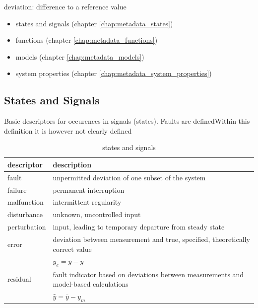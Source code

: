 deviation: difference to a reference value


\begin{itemize}
    \bfseries
    \item states and signals (chapter \ref{chap:metadata_states})
    \item functions (chapter \ref{chap:metadata_functions})
    \item models (chapter \ref{chap:metadata_models})
    \item system properties (chapter \ref{chap:metadata_system_properties})
\end{itemize}

\subsection{States and Signals}
Basic descriptors for occurences in signals (states). Faults are definedWithin this definition it is however not clearly defined

\label{chap:metadata_states}
\begin{table}[!h]
    \centering
    \begin{tabular}{@{}ll@{}}
        \toprule
        descriptor   & description                                                                           \\ \midrule
        fault        & unpermitted deviation of one subset of the system                                     \\
        failure      & permanent interruption                                                                \\
        malfunction  & intermittent regularity                                                               \\
        disturbance  & unknown, uncontrolled input                                                           \\
        perturbation & input, leading to temporary departure from steady state                               \\
        error        & deviation between measurement and true, specified, theoretically correct value        \\     & $y_e = \bar{y} -y$ \\
        residual     & fault indicator based on deviations between measurements and model-based calculations \\     & $\hat{y} = \bar{y} -y_m$ \\ \bottomrule
    \end{tabular}
    \caption{states and signals}
    \label{tab:states_and_signals}
\end{table}

